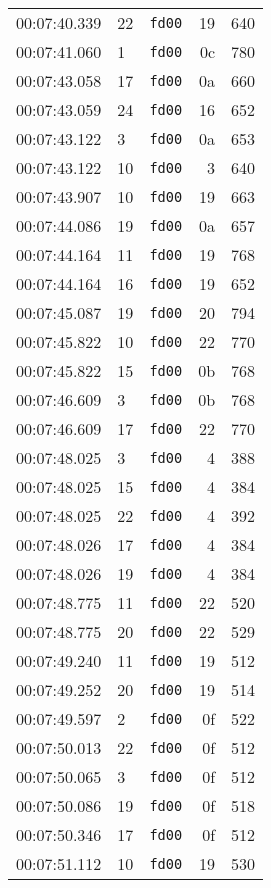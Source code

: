 \documentclass{article}
\begin{document}
\begin{longtable}{lllrr}
00:07:40.339 & 22 & \texttt{fd00} & 19 & 640 \\
00:07:41.060 & 1 & \texttt{fd00} & 0c & 780 \\
00:07:43.058 & 17 & \texttt{fd00} & 0a & 660 \\
00:07:43.059 & 24 & \texttt{fd00} & 16 & 652 \\
00:07:43.122 & 3 & \texttt{fd00} & 0a & 653 \\
00:07:43.122 & 10 & \texttt{fd00} & 3 & 640 \\
00:07:43.907 & 10 & \texttt{fd00} & 19 & 663 \\
00:07:44.086 & 19 & \texttt{fd00} & 0a & 657 \\
00:07:44.164 & 11 & \texttt{fd00} & 19 & 768 \\
00:07:44.164 & 16 & \texttt{fd00} & 19 & 652 \\
00:07:45.087 & 19 & \texttt{fd00} & 20 & 794 \\
00:07:45.822 & 10 & \texttt{fd00} & 22 & 770 \\
00:07:45.822 & 15 & \texttt{fd00} & 0b & 768 \\
00:07:46.609 & 3 & \texttt{fd00} & 0b & 768 \\
00:07:46.609 & 17 & \texttt{fd00} & 22 & 770 \\
00:07:48.025 & 3 & \texttt{fd00} & 4 & 388 \\
00:07:48.025 & 15 & \texttt{fd00} & 4 & 384 \\
00:07:48.025 & 22 & \texttt{fd00} & 4 & 392 \\
00:07:48.026 & 17 & \texttt{fd00} & 4 & 384 \\
00:07:48.026 & 19 & \texttt{fd00} & 4 & 384 \\
00:07:48.775 & 11 & \texttt{fd00} & 22 & 520 \\
00:07:48.775 & 20 & \texttt{fd00} & 22 & 529 \\
00:07:49.240 & 11 & \texttt{fd00} & 19 & 512 \\
00:07:49.252 & 20 & \texttt{fd00} & 19 & 514 \\
00:07:49.597 & 2 & \texttt{fd00} & 0f & 522 \\
00:07:50.013 & 22 & \texttt{fd00} & 0f & 512 \\
00:07:50.065 & 3 & \texttt{fd00} & 0f & 512 \\
00:07:50.086 & 19 & \texttt{fd00} & 0f & 518 \\
00:07:50.346 & 17 & \texttt{fd00} & 0f & 512 \\
00:07:51.112 & 10 & \texttt{fd00} & 19 & 530 \\

\end{longtable}
\end{document}
